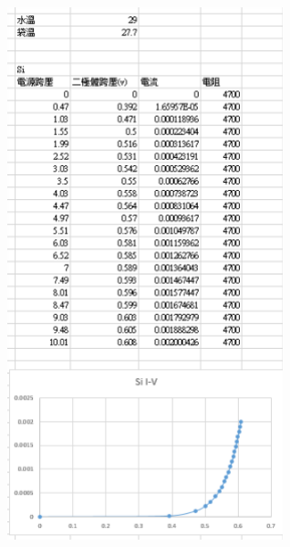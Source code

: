 \documentclass[UTF8]{ctexart}
\begin{document}
\begin{CJK*}{UTF8}{song}
\begin{minipage}[t]{0.48\textwidth}
\includegraphics[width = 0.6\textwidth]{29si.png}
\end{minipage}
 \\


\end{CJK*}
\end{document}

